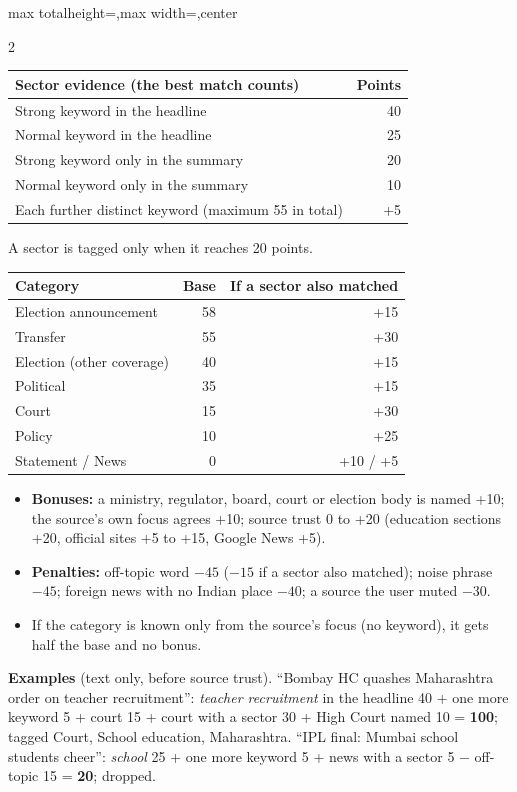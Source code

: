 \documentclass[8pt,a4paper]{extarticle}
\newcommand{\kw}[1]{\textit{#1}}
\newcommand{\lbl}[1]{\textbf{#1}}
\begin{document}
\begin{adjustbox}{max totalheight=\textheight,max width=\textwidth,center}
\begin{minipage}{\textwidth}
\begin{multicols}{2}
\vspace{2pt}
\begin{tabularx}{\columnwidth}{@{}Xr@{}}
\toprule
\lbl{Sector evidence} (the best match counts) & \lbl{Points}\\
\midrule
Strong keyword in the headline & 40\\
Normal keyword in the headline & 25\\
Strong keyword only in the summary & 20\\
Normal keyword only in the summary & 10\\
Each further distinct keyword (maximum 55 in total) & +5\\
\bottomrule
\end{tabularx}
{\color{muted}A sector is tagged only when it reaches 20 points.}

\vspace{3pt}
\begin{tabularx}{\columnwidth}{@{}Xrr@{}}
\toprule
\lbl{Category} & \lbl{Base} & \lbl{If a sector also matched}\\
\midrule
Election announcement & 58 & +15\\
Transfer & 55 & +30\\
Election (other coverage) & 40 & +15\\
Political & 35 & +15\\
Court & 15 & +30\\
Policy & 10 & +25\\
Statement / News & 0 & +10 / +5\\
\bottomrule
\end{tabularx}

\vspace{3pt}
\begin{itemize}
  \item \lbl{Bonuses:} a ministry, regulator, board, court or election body is named +10; the source's own focus
        agrees +10; source trust 0 to +20 (education sections +20, official sites +5 to +15, Google News +5).
  \item \lbl{Penalties:} off-topic word $-45$ ($-15$ if a sector also matched); noise phrase $-45$; foreign news
        with no Indian place $-40$; a source the user muted $-30$.
  \item If the category is known only from the source's focus (no keyword), it gets half the base and no bonus.
\end{itemize}

\lbl{Examples} (text only, before source trust). ``Bombay HC quashes Maharashtra order on teacher recruitment'':
\kw{teacher recruitment} in the headline 40 + one more keyword 5 + court 15 + court with a sector 30 + High Court
named 10 = \lbl{100}; tagged Court, School education, Maharashtra. ``IPL final: Mumbai school students cheer'':
\kw{school} 25 + one more keyword 5 + news with a sector 5 $-$ off-topic 15 = \lbl{20}; dropped.


\end{multicols}
\end{minipage}
\end{adjustbox}
\end{document}
